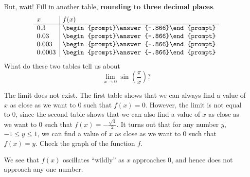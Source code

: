 \documentclass{ximera}
\begin{document}
\begin{question}
But, wait! Fill in another table, \textbf{rounding to three decimal places}.
  \[
  \begin{array}{l|l}
    x      & f(x)            \\ \hline
    0.3    &  \begin{prompt}\answer{-.866}\end{prompt} \\
    0.03   &  \begin{prompt}\answer{-.866}\end{prompt} \\
    0.003  &  \begin{prompt}\answer{-.866}\end{prompt} \\
    0.0003 &  \begin{prompt}\answer{-.866}\end{prompt}
  \end{array}
  \]
  What do these two tables tell us about
  \[
  \lim_{x\to 0}\sin\left(\frac{\pi}{x}\right)?
  \]
  \begin{multipleChoice}
  \end{multipleChoice}
  \begin{feedback}
   The limit does not exist. The first table shows that we can always find a value of $x$ as close as we want to $0$ such that $f(x)=0$.
   However, the limit is not equal to $0$, since the second table shows that we can also find a value of $x$ as close as we want to $0$ such that $f(x)=-\frac{\sqrt{3}}{2}$.
   It turns out that  for any number $y$, $-1\le y\le1$, we can find a value of $x$ as close as we want to $0$ such that $f(x)=y$. Check the graph of the function $f$.
    \begin{image}
    \end{image}
   We see that $f(x)$ oscillates ``wildly'' as $x$ approaches $0$, and hence does not approach any one number.
  \end{feedback}
\end{question}
\end{document}
